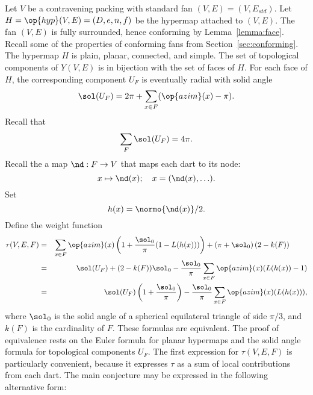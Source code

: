 Let $V$ be a contravening packing with
standard fan $(V,E)=(V,E_{std})$.  Let   $H=\op{hyp}(V,E)=(D,e,n,f)$ 
be the hypermap attached to $(V,E)$.  The fan $(V,E)$ is fully surrounded, hence
conforming by Lemma~\ref{lemma:face}.  Recall some of the properties of conforming fans from
Section~\ref{sec:conforming}.
The hypermap $H$ is plain, planar, connected, and simple.
The set of topological components of $Y(V,E)$ is in bijection with
the set of faces of $H$.  
%
For each face of $H$, the corresponding component $U_F$
is eventually radial with solid
angle
%
\begin{displaymath}
\sol(U_F) = 2\pi + \sum_{x\in F} (\op{azim}(x) -\pi).
\end{displaymath}
Recall that
\begin{displaymath}\sum_{F} \sol(U_F) = 4\pi.\end{displaymath}
Recall the a map $\nd:F\to V$ that maps each dart to its node:
\begin{displaymath}
x \mapsto \nd(x); \quad   x = (\nd(x),\ldots).
\end{displaymath}
Set 
\begin{displaymath}h(x) = \normo{\nd(x)}/2.\end{displaymath}
Define the weight function
\begin{eqnarray}
  \tau(V,E,F) &=&\sum_{x\in F} \op{azim}(x)
  \left(1 + \dfrac{\sol_0}{\pi}(1- L(h(x)))\right) 
  + \left(\pi+{\sol_0}\right) (2- k(F))\qquad\phantom{t}\vspace{6pt}\\
  &=& \sol(U_F) + (2- k(F))\sol_0 - \dfrac{\sol_0}{\pi}
\sum_{x\in F}\op{azim}(x) (L(h(x)) - 1)\vspace{6pt}\\
  &=& \sol(U_F) \left( 1 + \dfrac{\sol_0}{\pi}\right) 
- \dfrac{\sol_0}{\pi} \sum_{x\in F} \op{azim}(x)(L(h(x))),\label{eqn:tau-sol}
\end{eqnarray}
where $\sol_0$ is the solid angle of a spherical equilateral triangle
of side $\pi/3$, and $k(F)$ is the cardinality of $F$.
% 
These formulas are equivalent.  The proof of equivalence rests on the
Euler formula for planar hypermaps and the solid angle formula for
topological components $U_F$.  The first expression for $\tau(V,E,F)$
is particularly convenient, because it expresses $\tau$ as a sum of
local contributions from each dart.  %
%
%
The main conjecture may be expressed in the following alternative
form:

